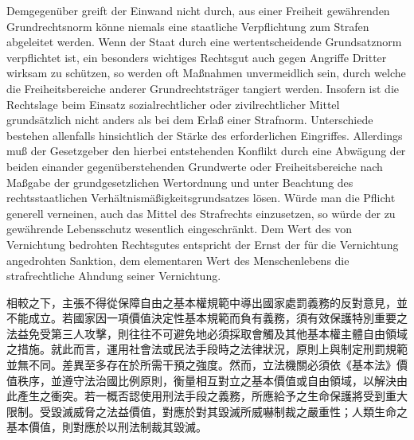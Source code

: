 \documentclass[12pt]{article}
\begin{document}
\syncleft
\begin{sourcepara}
Demgegenüber greift der Einwand nicht durch, aus einer Freiheit gewährenden Grundrechtsnorm könne niemals eine staatliche Verpflichtung zum Strafen abgeleitet werden. Wenn der Staat durch eine wertentscheidende Grundsatznorm verpflichtet ist, ein besonders wichtiges Rechtsgut auch gegen Angriffe Dritter wirksam zu schützen, so werden oft Maßnahmen unvermeidlich sein, durch welche die Freiheitsbereiche anderer Grundrechtsträger tangiert werden. Insofern ist die Rechtslage beim Einsatz sozialrechtlicher oder zivilrechtlicher Mittel grundsätzlich nicht anders als bei dem Erlaß einer Strafnorm. Unterschiede bestehen allenfalls hinsichtlich der Stärke des erforderlichen Eingriffes. Allerdings muß der Gesetzgeber den hierbei entstehenden Konflikt durch eine Abwägung der beiden einander gegenüberstehenden Grundwerte oder Freiheitsbereiche nach Maßgabe der grundgesetzlichen Wertordnung und unter Beachtung des rechtsstaatlichen Verhältnismäßigkeitsgrundsatzes lösen. Würde man die Pflicht generell verneinen, auch das Mittel des Strafrechts einzusetzen, so würde der zu gewährende Lebensschutz wesentlich eingeschränkt. Dem Wert des von Vernichtung bedrohten Rechtsgutes entspricht der Ernst der für die Vernichtung angedrohten Sanktion, dem elementaren Wert des Menschenlebens die strafrechtliche Ahndung seiner Vernichtung.
\end{sourcepara}
\begin{transpara}
相較之下，主張不得從保障自由之基本權規範中導出國家處罰義務的反對意見，並不能成立。若國家因一項價值決定性基本規範而負有義務，須有效保護特別重要之法益免受第三人攻擊，則往往不可避免地必須採取會觸及其他基本權主體自由領域之措施。就此而言，運用社會法或民法手段時之法律狀況，原則上與制定刑罰規範並無不同。差異至多存在於所需干預之強度。然而，立法機關必須依《基本法》價值秩序，並遵守法治國比例原則，衡量相互對立之基本價值或自由領域，以解決由此產生之衝突。若一概否認使用刑法手段之義務，所應給予之生命保護將受到重大限制。受毀滅威脅之法益價值，對應於對其毀滅所威嚇制裁之嚴重性；人類生命之基本價值，則對應於以刑法制裁其毀滅。
\end{transpara}
\end{document}
